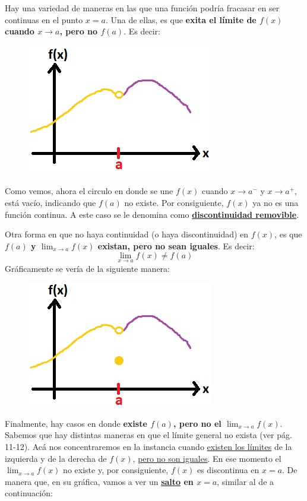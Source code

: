 \documentclass[12pt]{article}
\begin{document}
Hay una variedad de maneras en las que una función podría fracasar en ser continuas en el punto $x = a$. Una de ellas, es que \textbf{exita el límite de $f(x)$ cuando $x \to a$, pero no $f(a)$}. Es decir:

\begin{figure}[hbt!]
\centering
\includegraphics[scale=0.7]{img/continuity_plot_2.jpg}
\end{figure}

Como vemos, ahora el circulo en donde se une $f(x)$ cuando $x \to a^{-}$ y $x \to a^{+}$, está vacío, indicando que $f(a)$ no existe. Por consiguiente, $f(x)$ ya no es una función continua. A este caso se le denomina como \textbf{\underline{discontinuidad removible}}.

Otra forma en que no haya continuidad (o haya discontinuidad) en $f(x)$, es que \textbf{$f(a)$ y $\lim_{x \to a}f(x)$ existan, pero no sean iguales}. Es decir:
\[\lim_{x \to a}f(x) \neq f(a)\]
Gráficamente se vería de la siguiente manera:
\newpage
\begin{figure}[hbt!]
\centering
\includegraphics[scale=0.7]{img/continuity_plot_3.jpg}
\end{figure}

Finalmente, hay casos en donde \textbf{existe $f(a)$, pero no el $\lim_{x \to a} f(x)$}. Sabemos que hay distintas maneras en que el límite general no exista (ver pág. 11-12). Acá nos concentraremos en la instancia cuando \underline{existen los límites} de la izquierda y de la derecha de $f(x)$, \underline{pero no son iguales}. En ese momento el $\lim_{x \to a} f(x)$ no existe y, por consiguiente, $f(x)$ es discontinua en $x = a$. De manera que, en su gráfica, vamos a ver un \textbf{\underline{salto} en $x = a$}, similar al de a continuación:
\end{document}
